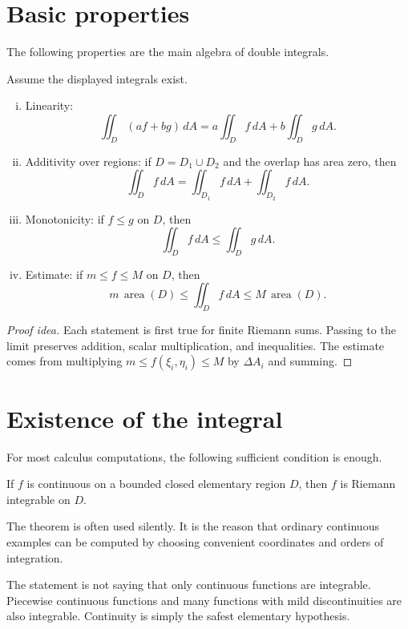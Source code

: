 \section{Basic properties}

The following properties are the main algebra of double integrals.

\begin{proposition}
Assume the displayed integrals exist.
\begin{enumerate}[(i)]
  \item Linearity:
  \[
    \iint_D(af+bg)\,dA=a\iint_D f\,dA+b\iint_D g\,dA.
  \]
  \item Additivity over regions: if \(D=D_1\cup D_2\) and the overlap has area zero, then
  \[
    \iint_D f\,dA=\iint_{D_1}f\,dA+\iint_{D_2}f\,dA.
  \]
  \item Monotonicity: if \(f\le g\) on \(D\), then
  \[
    \iint_D f\,dA\le\iint_D g\,dA.
  \]
  \item Estimate: if \(m\le f\le M\) on \(D\), then
  \[
    m\,\operatorname{area}(D)\le \iint_D f\,dA\le M\,\operatorname{area}(D).
  \]
\end{enumerate}
\end{proposition}

\begin{proof}[Proof idea]
Each statement is first true for finite Riemann sums.  Passing to the limit preserves addition, scalar multiplication, and inequalities.  The estimate comes from multiplying \(m\le f(\xi_i,\eta_i)\le M\) by \(\Delta A_i\) and summing.
\end{proof}

\section{Existence of the integral}

For most calculus computations, the following sufficient condition is enough.

\begin{theorem}
If \(f\) is continuous on a bounded closed elementary region \(D\), then \(f\) is Riemann integrable on \(D\).
\end{theorem}

The theorem is often used silently.  It is the reason that ordinary continuous examples can be computed by choosing convenient coordinates and orders of integration.

\begin{remark}
The statement is not saying that only continuous functions are integrable.  Piecewise continuous functions and many functions with mild discontinuities are also integrable.  Continuity is simply the safest elementary hypothesis.
\end{remark}

